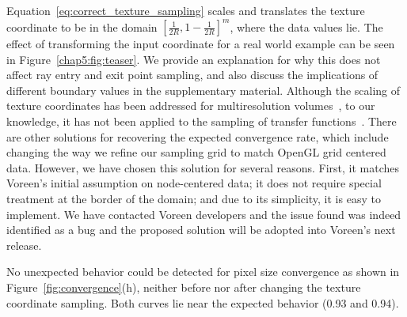 Equation~\eqref{eq:correct_texture_sampling} scales and translates the
texture coordinate to be in the domain $[\frac{1}{2R},
  1-\frac{1}{2R}]^m$, where the data values lie.  The effect of
transforming the input coordinate for a real world example can be seen
in Figure~\ref{chap5:fig:teaser}.  We provide an explanation for why this
does not affect ray entry and exit point sampling, and also discuss
the implications of different boundary values in the supplementary
material.  Although the scaling of texture coordinates has been
addressed for multiresolution volumes~\cite{LjungLY06}, to our
knowledge, it has not been applied to the sampling of transfer
functions~\cite{Real-TimeVolumeGraphics06,Kruger03,Roettger03}.
%
There are other solutions for recovering the expected convergence
rate, which include changing the way we refine our sampling grid to
match OpenGL grid centered data.  However, we have chosen this
solution for several reasons. First, it matches Voreen's initial
assumption on node-centered data; it does not require special
treatment at the border of the domain; and due to its simplicity, it
is easy to implement.
%
We have contacted Voreen developers and the issue found was indeed
identified as a bug and the proposed solution will be adopted into
Voreen's next release.

No unexpected behavior could be detected for pixel size convergence as
shown in Figure~\ref{fig:convergence}(h), neither before nor
after changing the texture coordinate sampling. Both curves lie near 
the expected behavior (0.93 and 0.94).

